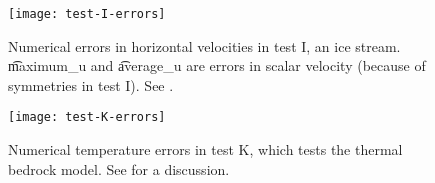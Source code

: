 \begin{figure}[ht]
\centering
\texttt{[image: test-I-errors]}
\caption{Numerical errors in horizontal velocities in test I, an ice stream. \t{maximum_u} and \t{average_u} are errors in scalar velocity (because of symmetries in test I).  See \cite{SchoofStream,BBssasliding}.}
\label{fig:velerrsI}
\end{figure}

\begin{figure}[ht]
\centering
\texttt{[image: test-K-errors]}
\caption{Numerical temperature errors in test K, which tests the thermal bedrock model.  See \cite{BuelerTestK} for a discussion.}
\label{fig:temperrsK}
\end{figure}


